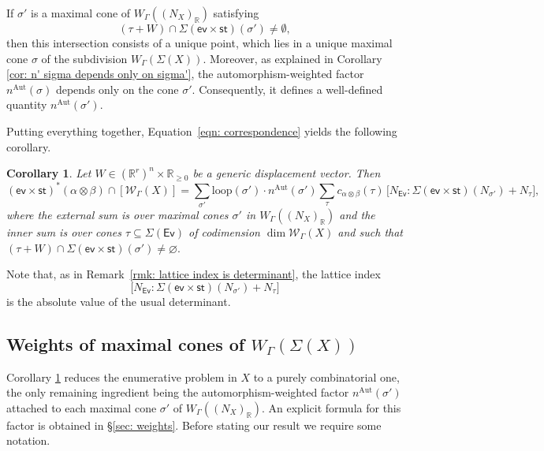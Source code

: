 \documentclass{article}
\def\Ev{{\mathsf{Ev}}}
\def\R{\mathbb{R}}
\def\WG{\mathcal{W}_{\Gamma}}
\newtheorem{corollary}[definition]{Corollary}
\newcommand{\nn}{n^{\operatorname{Aut}}}
\begin{document}
If $\sigma'$ is a maximal cone of $W_{\Gamma}((N_X)_\R)$ satisfying
\[
(\tau + W)\cap \Sigma(\mathsf{ev}\times\mathsf{st})(\sigma')\neq\emptyset,
\]
then this intersection consists of a unique point, which lies in a unique maximal cone $\sigma$ of the subdivision $W_{\Gamma}(\Sigma(X))$. Moreover, as explained in Corollary \ref{cor: n' sigma depends only on sigma'}, the automorphism-weighted factor $\nn(\sigma)$ depends only on the cone $\sigma'$. Consequently, it defines a well-defined quantity $\nn(\sigma')$. 

Putting everything together, Equation~\eqref{eqn: correspondence} yields the following corollary.

\begin{corollary}\label{cor: correspondence_thm_Hannah_style}
    Let $W \in (\mathbb{R}^r)^n \times \mathbb{R}_{\geq 0}$ be a generic displacement vector. Then
    \begin{equation}\label{eqn: correspondence bis}
(\mathsf{ev} \times \mathsf{st})^*(\alpha \otimes \beta) \cap [\WG(X)]
=
\sum_{\sigma'} \mathrm{loop}(\sigma')
\cdot \nn(\sigma') 
\sum_{\tau}
c_{\alpha \otimes \beta}(\tau)\,
\bigl[ 
N_{\Ev}: \Sigma( \mathsf{ev} \times \mathsf{st})(N_{\sigma'})  + N_\tau
\bigr],
\end{equation}
where the external sum is over maximal cones $\sigma'$ in $W_\Gamma((N_X)_\R)$ and the inner sum is over cones $\tau \subseteq \Sigma(\mathsf{Ev})$ of codimension $\dim \WG(X)$ and such that $(\tau + W) \cap \Sigma( \mathsf{ev} \times \mathsf{st})(\sigma') \neq \varnothing.$
\end{corollary}

Note that, as in Remark~\ref{rmk: lattice index is determinant}, the lattice index
\[
\bigl[
N_{\Ev}: \Sigma( \mathsf{ev} \times \mathsf{st})(N_{\sigma'})  + N_\tau
\bigr]
\]
is the absolute value of the usual determinant. 





\subsection{Weights of maximal cones of $W_{\Gamma}(\Sigma(X))$}\label{sec: result weights}


Corollary \ref{cor: correspondence_thm_Hannah_style} reduces the enumerative problem in $X$ to a purely combinatorial one, the only remaining ingredient being the automorphism-weighted factor
$
\nn(\sigma')
$
attached to each maximal cone $\sigma'$ of $W_{\Gamma}((N_{X})_\R)$. An explicit formula for this factor is obtained in \S\ref{sec: weights}. Before stating our result we require some notation.
\end{document}
